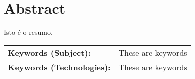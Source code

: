 
\section*{Abstract}

Isto é o resumo.

\begin{table}[h]
\begin{tabular}{ll}
\textbf{Keywords (Subject):}      & These are keywords \\
\textbf{Keywords (Technologies):} & These are keywords
\end{tabular}
\end{table}